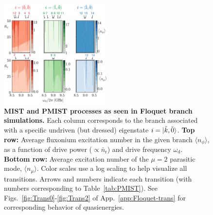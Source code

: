 \documentclass[%
reprint,
superscriptaddress,
 amsmath,amssymb,
 aps,
 prx,
longbibliography,
floatfix,
]{revtex4-2}
\begin{document}
\begin{figure}[!htb]
    \centering
    \includegraphics[width=0.5\textwidth]{Figures/Floquet_min.pdf}
    \caption{{\bf MIST and PMIST processes as seen in Floquet branch simulations.}  
    Each column corresponds to the branch associated with a specific undriven (but dressed) eigenstate $i=\ket{\tilde{k},\tilde{0}}$.  
    \textbf{Top row:} Average fluxonium excitation number in the given branch $\langle n_\phi\rangle$, as a function of drive power ($\propto\bar{n}_\textrm{r}$) and drive frequency $\omega_\textrm{d}$. \textbf{Bottom row:} Average excitation number of the $\mu=2$ parasitic mode, $\langle n_\mu\rangle$. Color scales use a log scaling to help visualize all transitions. Arrows and numbers indicate each transition (with numbers corresponding to Table~\ref{tab:PMIST}). See Figs.~\ref{fig:Trans0}-\ref{fig:Trans2} of App.~\ref{app:Floquet-trans} for corresponding behavior of quasienergies.}
    \label{fig:Floquet}
\end{figure}
\end{document}
